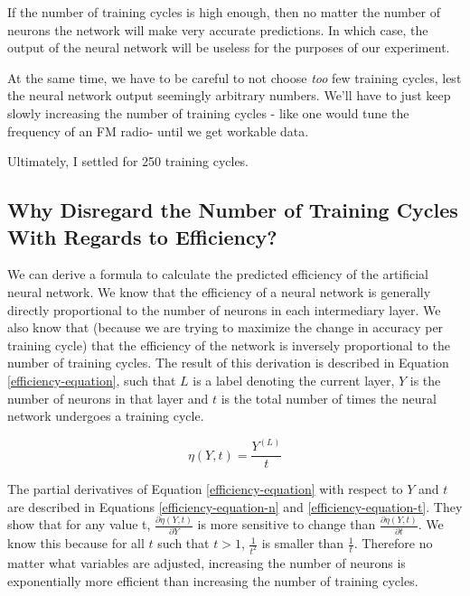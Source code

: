 \documentclass[12pt]{article}
\begin{document}
If the number of training cycles is high enough, then no matter the number of neurons the network will make very accurate predictions. In which case, the output of the neural network will be useless for the purposes of our experiment.

At the same time, we have to be careful to not choose \textit{too} few training cycles, lest the neural network output seemingly arbitrary numbers. We'll have to just keep slowly increasing the number of training cycles - like one would tune the frequency of an FM radio- until we get workable data.

Ultimately, I settled for 250 training cycles.

\subsection{Why Disregard the Number of Training Cycles With Regards to Efficiency?}


We can derive a formula to calculate the predicted efficiency of the artificial neural network. We know that the efficiency of a neural network is generally directly proportional to the number of neurons in each intermediary layer. We also know that (because we are trying to maximize the change in accuracy per training cycle) that the efficiency of the network is inversely proportional to the number of training cycles. The result of this derivation is described in Equation \ref{efficiency-equation}, such that $L$ is a label denoting the current layer, $Y$ is the number of neurons in that layer and $t$ is the total number of times the neural network undergoes a training cycle.

\begin{equation} \label{efficiency-equation}
    \eta(Y, t) =  \frac{Y^{(L)}}{t}
\end{equation}

The partial derivatives of Equation \ref{efficiency-equation} with respect to $Y$ and $t$ are described in Equations \ref{efficiency-equation-n} and \ref{efficiency-equation-t}. They show that for any value t, $\frac{\partial \eta(Y, t)}{\partial Y}$ is more sensitive to change than $\frac{\partial \eta(Y, t)}{\partial t}$. We know this because for all $t$ such that $t > 1$, $\frac{1}{t^2}$ is smaller than $\frac{1}{t}$. Therefore no matter what variables are adjusted, increasing the number of neurons is exponentially more efficient than increasing the number of training cycles.
\end{document}

